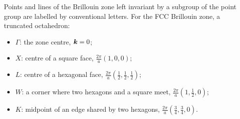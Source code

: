 \begin{definition}
Points and lines of the Brillouin zone left invariant by a subgroup of the point group are labelled by conventional letters. For the FCC Brillouin zone, a truncated octahedron:
\begin{itemize}
    \item $\Gamma$: the zone centre, $\bm{k} = 0$;
    \item $X$: centre of a square face, $\frac{2\pi}{a}(1,0,0)$;
    \item $L$: centre of a hexagonal face, $\frac{2\pi}{a}\left(\tfrac12,\tfrac12,\tfrac12\right)$;
    \item $W$: a corner where two hexagons and a square meet, $\frac{2\pi}{a}\left(1,\tfrac12,0\right)$;
    \item $K$: midpoint of an edge shared by two hexagons, $\frac{2\pi}{a}\left(\tfrac34,\tfrac34,0\right)$.
\end{itemize}
\end{definition}

